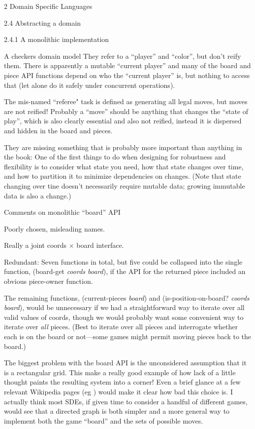 \documentclass[12pt]{PalisadesLakesBook}
\begin{document}
\begin{plSection}{}
\begin{plSection}{2 Domain Specific Languages}
\begin{plSection}{2.4 Abstracting a domain}
\begin{plSection}{2.4.1 A monolithic implementation}
\begin{plSection}{A checkers domain model}
They refer to a ``player'' and ``color'', but don't reify them.
There is apparently a mutable ``current player'' 
and many of the {\schemeFont board} and {\schemeFont piece}
API functions depend on who the ``current player'' is,
but nothing to access that (let alone do it safely under 
concurrent operations).

The mis-named ``referee" task is defined as generating all legal
moves, but moves are not reified!
Probably a ``move'' should be anything that changes the
``state of play'', 
which is also clearly essential and also not reified,
instead it is dispersed and hidden in the board and pieces.

They are missing something that is probably more important 
than anything in the book:
One of the first things to do when designing for robustness and
flexibility is to consider what state you need,
how that state changes over time, 
and how to partition it to minimize dependencies on changes.
(Note that state changing over tine doesn't necessarily require
mutable data; growing immutable data is also a change.)

\begin{plSection}{Comments on monolithic ``board'' API}

Poorly chosen, misleading names.

Really a joint {\schemeFont coords} $\times$ {\schemeFont board}
interface.

Redundant: Seven functions in total, 
but five could be collapsed into the single function, 
{\schemeFont (board-get {\itshape coords board})},
if the API for the returned {\schemeFont piece} included
an obvious {\schemeFont piece-owner} function.
 
The remaining functions, 
{\schemeFont (current-pieces {\itshape board})} and 
{\schemeFont (is-position-on-board? {\itshape coords board})},
would be unnecessary if we had a straightforward way to iterate
over all valid values of {\schemeFont coords},
though we would probably want some convenient way to iterate
over \emph{all} {\schemeFont pieces}.
(Best to iterate over all pieces and interrogate whether each is 
on the board or not---some games might permit moving pieces
back to the board.)

The biggest problem with the {\schemeFont board} API is 
the unconsidered assumption that it is a rectangular grid.
This make a really good example of how lack of a little thought
paints the resulting system into a corner!
Even a brief glance at a few relevant Wikipedia pages
(eg )
would make it clear how bad this choice is.
I actually think most SDEs, if given time to consider
a handful of different games, would see that a directed graph
is both simpler and a more general way to implement both the game  
``board'' and the sets of possible moves.


\end{plSection}
\end{plSection}
\end{plSection}
\end{plSection}
\end{plSection}
\end{plSection}
\end{document}
